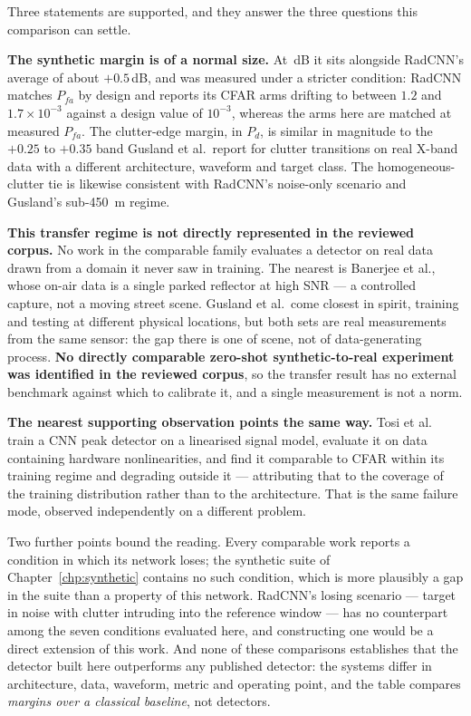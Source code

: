 Three statements are supported, and they answer the three questions this comparison can settle.

\textbf{The synthetic margin is of a normal size.} At \SynSnrGainDL{}\,dB it sits alongside
RadCNN's average of about $+0.5$\,dB, and was measured under a stricter condition: RadCNN matches
$P_{fa}$ by design and reports its CFAR arms drifting to between $1.2$ and
$1.7 \times 10^{-3}$ against a design value of $10^{-3}$, whereas the arms here are matched at
measured $P_{fa}$. The clutter-edge margin,
\SynClutterEdgeDiff{} in $P_d$, is similar in magnitude to the $+0.25$ to $+0.35$ band Gusland
et al.\ report for clutter transitions on real X-band data with a different architecture, waveform
and target class. The homogeneous-clutter tie is likewise consistent with RadCNN's noise-only
scenario and Gusland's sub-\SI{450}{\metre} regime.

\textbf{This transfer regime is not directly represented in the reviewed corpus.} No work in the
comparable family evaluates a detector on real data drawn from a domain it never saw in training.
The nearest is Banerjee et al., whose on-air data is a single parked reflector at high SNR ---
a controlled capture, not a moving street scene. Gusland et al.\ come closest in spirit, training
and testing at different physical locations, but both sets are real measurements from the same
sensor: the gap there is one of scene, not of data-generating process. \textbf{No directly
comparable zero-shot synthetic-to-real experiment was identified in the reviewed corpus}, so the
transfer result has no external benchmark against which to calibrate it, and a single measurement is
not a norm.

\textbf{The nearest supporting observation points the same way.} Tosi et
al.~\cite{tosi2025benchmarking} train a CNN peak detector on a linearised signal model, evaluate it
on data containing hardware nonlinearities, and find it comparable to CFAR within its training
regime and degrading outside it --- attributing that to the coverage of the training distribution
rather than to the architecture. That is the same failure mode, observed independently on a
different problem.

Two further points bound the reading. Every comparable work reports a condition in which its network
loses; the synthetic suite of Chapter~\ref{chp:synthetic} contains no such condition, which is more
plausibly a gap in the suite than a property of this network. RadCNN's losing scenario --- target in
noise with clutter intruding into the reference window --- has no counterpart among the seven
conditions evaluated here, and constructing one would be a direct extension of this work. And none
of these comparisons establishes that the detector built here outperforms any published detector:
the systems differ in architecture, data, waveform, metric and operating point, and the table
compares \emph{margins over a classical baseline}, not detectors.

